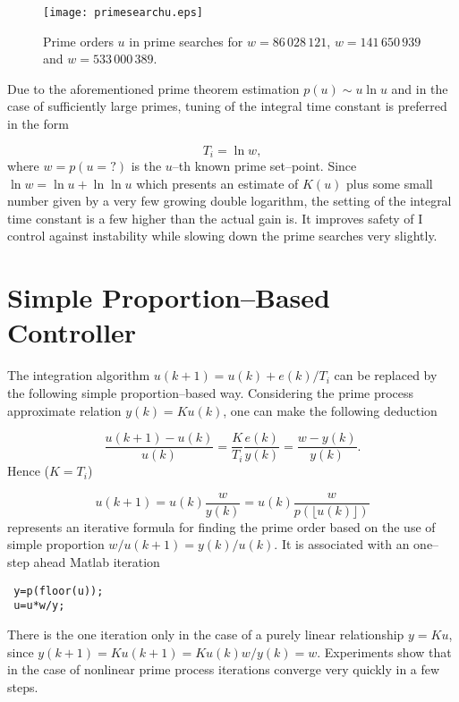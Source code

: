 \documentclass[12pt,a4paper,twoside]{article}
\begin{document}
\begin{figure}[htbp]
\begin{center}
\texttt{[image: primesearchu.eps]}
\end{center}
\caption{\small Prime orders $u$ in prime searches for $w=86\,028\,121$, $w=141\,650\,939$ and $w=533\,000\,389$.}
\label{primesearchu}
\end{figure}

\vspace{0.3cm}\noindent Due to the aforementioned prime theorem estimation $p(u) \sim u\ln u$ and in the case of sufficiently large primes, tuning of the integral time constant is preferred in the form 

$$T_i=\ln w,$$ 
where $ w = p (u=?)$ is the $u$--th known prime set--point. Since $ \ln w = \ln u + \ln \ln u $ which presents an estimate of $K (u) $ plus some small number given by a very few growing double logarithm, the setting of the integral time constant is a few higher than the actual gain is. It improves safety of I control against instability while slowing down the prime searches very slightly.

\section{Simple Proportion--Based Controller}

\vspace{0.3cm}\noindent The integration algorithm $u(k + 1) = u (k) + e (k) /T_i$ can be replaced by the following simple proportion--based way. Considering the prime process approximate relation $y (k) = Ku(k) $, one can make the following deduction 

$$
\frac{u(k+1)-u(k)}{u(k)}=\frac{K}{T_i}\frac{e(k)}{y(k)}=\frac{w-y(k)}{y(k)}.
$$
Hence ($K=T_i$)

$$
u(k+1)=u(k)\frac{w}{y(k)}=u(k)\frac{w}{p(\lfloor u(k)\rfloor)}
$$
represents an iterative formula for finding the prime order based on the use of simple proportion $w/u(k+1)=y(k)/u(k)$. It is associated with an one--step ahead Matlab iteration 

 \begin{verbatim}
 y=p(floor(u));
 u=u*w/y;
 \end{verbatim} 
There is the one iteration only in the case of a purely linear relationship $y = Ku$, since $y (k + 1) = Ku(k+1) = Ku(k) w / y (k) = w $. Experiments show that in the case of nonlinear prime process iterations converge very quickly in a few steps.
\end{document}
